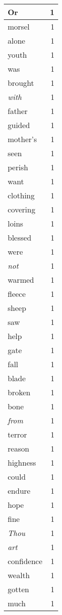 \begin{center}
\begin{longtable}{l|r}
Or & 1 \\ \hline
morsel & 1 \\ \hline
alone & 1 \\ \hline
youth & 1 \\ \hline
was & 1 \\ \hline
brought & 1 \\ \hline
\emph{with} & 1 \\ \hline
father & 1 \\ \hline
guided & 1 \\ \hline
mother's & 1 \\ \hline
seen & 1 \\ \hline
perish & 1 \\ \hline
want & 1 \\ \hline
clothing & 1 \\ \hline
covering & 1 \\ \hline
loins & 1 \\ \hline
blessed & 1 \\ \hline
were & 1 \\ \hline
\emph{not} & 1 \\ \hline
warmed & 1 \\ \hline
fleece & 1 \\ \hline
sheep & 1 \\ \hline
saw & 1 \\ \hline
help & 1 \\ \hline
gate & 1 \\ \hline
fall & 1 \\ \hline
blade & 1 \\ \hline
broken & 1 \\ \hline
bone & 1 \\ \hline
\emph{from} & 1 \\ \hline
terror & 1 \\ \hline
reason & 1 \\ \hline
highness & 1 \\ \hline
could & 1 \\ \hline
endure & 1 \\ \hline
hope & 1 \\ \hline
fine & 1 \\ \hline
\emph{Thou} & 1 \\ \hline
\emph{art} & 1 \\ \hline
confidence & 1 \\ \hline
wealth & 1 \\ \hline
gotten & 1 \\ \hline
much & 1 \\ \hline

\end{longtable}
\end{center}
